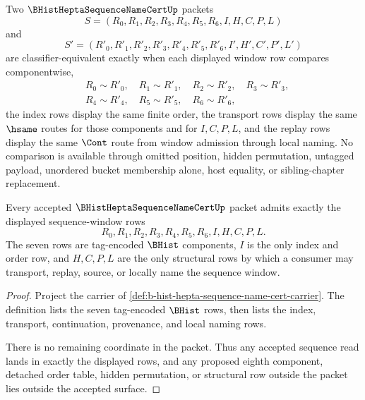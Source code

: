 \begin{definition}
\label{def:b-hist-hepta-sequence-name-cert-classifier}
Two $\BHistHeptaSequenceNameCertUp$ packets
$$
S=(R_0,R_1,R_2,R_3,R_4,R_5,R_6,I,H,C,P,L)
$$
and
$$
S'=(R'_0,R'_1,R'_2,R'_3,R'_4,R'_5,R'_6,I',H',C',P',L')
$$
are classifier-equivalent exactly when each displayed window row compares componentwise,
$$
\begin{aligned}
&R_0 \sim R'_0,\quad R_1 \sim R'_1,\quad R_2 \sim R'_2,\quad R_3 \sim R'_3,\\
&R_4 \sim R'_4,\quad R_5 \sim R'_5,\quad R_6 \sim R'_6,
\end{aligned}
$$
the index rows display the same finite order, the transport rows display the same $\hsame$ routes for those components and for $I,C,P,L$, and the replay rows display the same $\Cont$ route from window admission through local naming. No comparison is available through omitted position, hidden permutation, untagged payload, unordered bucket membership alone, host equality, or sibling-chapter replacement.
\end{definition}

\begin{theorem}
\label{thm:b-hist-hepta-sequence-name-cert-carrier-admission}
Every accepted $\BHistHeptaSequenceNameCertUp$ packet admits exactly the displayed sequence-window rows
$$
R_0,R_1,R_2,R_3,R_4,R_5,R_6,I,H,C,P,L.
$$
The seven rows are tag-encoded $\BHist$ components, $I$ is the only index and order row, and $H,C,P,L$ are the only structural rows by which a consumer may transport, replay, source, or locally name the sequence window.
\end{theorem}
\begin{proof}
Project the carrier of \autoref{def:b-hist-hepta-sequence-name-cert-carrier}. The definition lists the seven tag-encoded $\BHist$ rows, then lists the index, transport, continuation, provenance, and local naming rows.

There is no remaining coordinate in the packet. Thus any accepted sequence read lands in exactly the displayed rows, and any proposed eighth component, detached order table, hidden permutation, or structural row outside the packet lies outside the accepted surface.
\end{proof}

